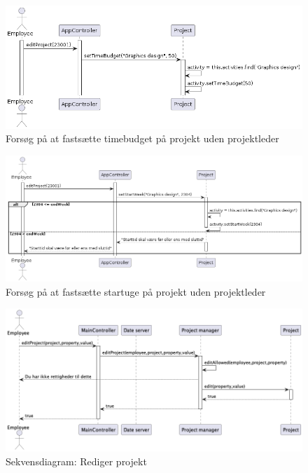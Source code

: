 \begin{figure}[H]
    \centering
    \caption{Forsøg på at fastsætte timebudget på projekt uden projektleder}\label{fig:sequence_create_PA_no_PL_2}
    \includegraphics[width = .75\textwidth]{RequirementsAndDesign/Diagrams/createActivityNoPLCase2.png}
\end{figure}
\begin{figure}[H]
    \centering
    \caption{Forsøg på at fastsætte startuge på projekt uden projektleder}\label{fig:sequence_create_PA_no_PL_3}
    \includegraphics[width = .75\textwidth]{RequirementsAndDesign/Diagrams/createActivityNoPLCase3.png}
\end{figure}
\begin{figure}[H]
    \centering
    \caption{Sekvensdiagram: Rediger projekt}\label{fig:sequence_project_edit}
    \includegraphics[width = .75\textwidth]{Diagrams/seq_project_edit.png}
\end{figure}
